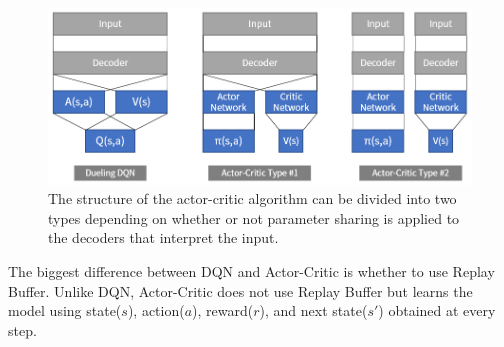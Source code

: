 \begin{figure}[H]
\centering
\includegraphics[scale=0.618]{pix/sac/rl4_0.png}
\caption{The structure of the actor-critic algorithm can be divided into 
two types depending on whether or not parameter sharing is applied to 
the decoders that interpret the input.}
\label{fig:two_types_actor_critic}
\end{figure}

The biggest difference between DQN and Actor-Critic is whether to use 
Replay Buffer. Unlike DQN, Actor-Critic does not use Replay Buffer but 
learns the model using state($s$), action($a$), reward($r$), and next 
state($s'$) obtained at every step.

